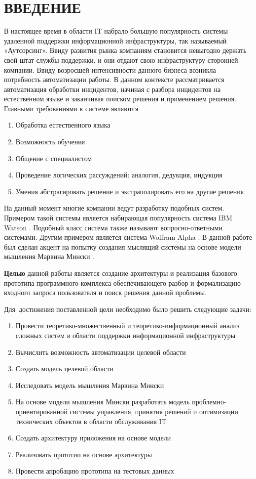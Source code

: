 \chapter*{ВВЕДЕНИЕ}							%
В настоящее время в области IT набрало большую популярность системы удаленной поддержки информационной инфраструктуры, так называемый «Аутсорсинг». Ввиду развития рынка компаниям становится невыгодно держать свой штат службы поддержки, и они отдают свою инфраструктуру сторонней компании.
Ввиду возросшей интенсивности данного бизнеса возникла потребность автоматизации работы. В данном контексте рассматривается автоматизация обработки инцидентов, начиная с разбора инцидентов на естественном языке и заканчивая поиском решения и применением решения.
Главными требованиями к системе являются
\begin{enumerate}
  \item Обработка естественного языка
  \item Возможность обучения
  \item Общение с специалистом
  \item Проведение логических рассуждений: аналогия, дедукция, индукция
  \item Умения абстрагировать решение и экстраполировать его на другие решения
\end{enumerate}
На данный момент многие компании ведут разработку подобных систем. Примером такой системы является набирающая популярность система IBM Watson \cite{Watson}. Подобный класс система также называют вопросно-ответными системами. Другим примером является система Wolfram Alpha \cite{WolframAplha}.
В данной работе был сделан акцент на попытку создания мыслящий системы на основе модели мышления Марвина Мински \cite{EmotionMachine}.

\textbf{Целью} данной работы является создание архитектуры и реализация базового прототипа программного комплекса обеспечивающего разбор и формализацию входного запроса пользователя и поиск решения данной проблемы.

Для~достижения поставленной цели необходимо было решить следующие задачи:
\begin{enumerate}
  \item Провести теоретико-множественный и теоретико-информационный анализ сложных систем в области поддержки информационной инфраструктуры
  \item Вычислить возможность автоматизации целевой области
  \item Создать модель целевой области
  \item Исследовать модель мышления Марвина Мински
  \item На основе модели мышления Мински разработать модель проблемно-ориентированной системы управления, принятия решений и оптимизации технических объектов в области обслуживания IT  
  \item Создать архитектуру приложения на основе модели
  \item Реализовать прототип на основе архитектуры
  \item Провести апробацию прототипа на тестовых данных
\end{enumerate}

